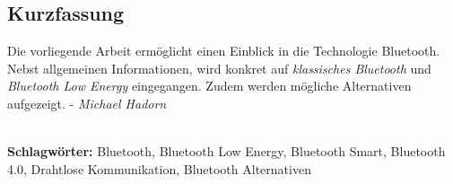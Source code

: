 
\subsection*{Kurzfassung}
Die vorliegende Arbeit ermöglicht einen Einblick in die Technologie Bluetooth.
Nebst allgemeinen Informationen, wird konkret auf \textit{klassisches Bluetooth} und \textit{Bluetooth Low Energy} eingegangen.
Zudem werden mögliche Alternativen aufgezeigt.
 - \textit{Michael Hadorn}


%
\mbox{}\\[0.5\baselineskip]\noindent
\textbf{Schlagwörter:} 
Bluetooth, Bluetooth Low Energy, Bluetooth Smart, Bluetooth 4.0, Drahtlose Kommunikation, Bluetooth Alternativen
